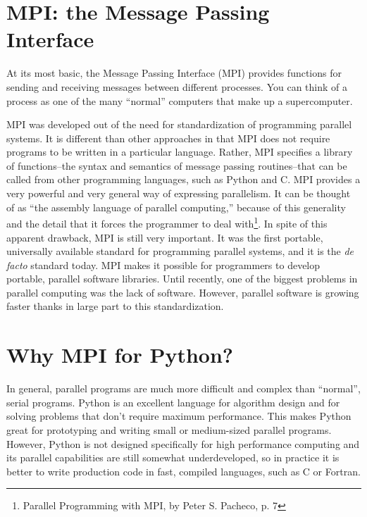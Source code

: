 \section*{MPI: the Message Passing Interface}
At its most basic, the Message Passing Interface (MPI) provides functions for
sending and receiving messages between different processes. You can think of a
process as one of the many ``normal'' computers that make up a supercomputer.

MPI was developed out of the need for standardization of programming parallel
systems. It is different than other approaches in that MPI does not require
programs to be written in a particular language. Rather, MPI specifies a library
of functions--the syntax and semantics of message passing routines--that can be
called from other programming languages, such as Python and C. MPI provides a
very powerful and very general way of expressing parallelism. It can be thought
of as ``the assembly language of parallel computing,'' because of this
generality and the detail that it forces the programmer to deal
with\footnote{Parallel Programming with MPI, by Peter S. Pacheco, p. 7}. In
spite of this apparent drawback, MPI is still very important. It was the first
portable, universally available standard for programming parallel systems, and
it is the \emph{de facto} standard today. MPI makes it possible for programmers
to develop portable, parallel software libraries. Until recently, one of the
biggest problems in parallel computing was the lack of software. However,
parallel software is growing faster thanks in large part to this
standardization.


\section*{Why MPI for Python?}
In general, parallel programs are much more difficult and complex than
``normal'', serial programs. Python is an excellent language for algorithm
design and for solving problems that don't require maximum performance. This
makes Python great for prototyping and writing small or medium-sized parallel
programs. However, Python is not designed specifically for high performance
computing and its parallel capabilities are still somewhat underdeveloped, so in
practice it is better to write production code in fast, compiled languages, such
as C or Fortran.

